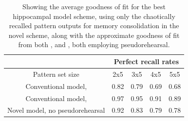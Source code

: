 \begin{table}[]
\centering
\caption{Showing the average goodness of fit for the best hippocampal model scheme, using only the chaotically recalled pattern outputs for memory consolidation in the novel scheme, along with the approximate goodness of fit from both \citep{Hattori2014}, and \citep{Hattori2010}, both employing pseudorehearsal.}
\label{table:comparison-goodness-of-fit}
\begin{tabular}{c|c|c|c|c|}
\cline{2-5}
                                                      & \multicolumn{4}{c|}{Perfect recall rates} \\ \hline
\multicolumn{1}{|c|}{Pattern set size}                & 2x5      & 3x5      & 4x5      & 5x5      \\ \hline
\multicolumn{1}{|c|}{Conventional model, \citep{Hattori2010}}              & 0.82     & 0.79     & 0.69     & 0.68     \\ \hline
\multicolumn{1}{|c|}{Conventional model, \citep{Hattori2014}}              & 0.97     & 0.95     & 0.91     & 0.89     \\ \hline
\multicolumn{1}{|c|}{Novel model, no pseudorehearsal} & 0.92     & 0.83     & 0.79     & 0.78     \\ \hline
\end{tabular}
\end{table}

